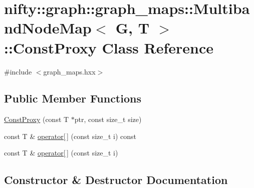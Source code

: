 \hypertarget{classnifty_1_1graph_1_1graph__maps_1_1MultibandNodeMap_1_1ConstProxy}{}\section{nifty\+:\+:graph\+:\+:graph\+\_\+maps\+:\+:Multiband\+Node\+Map$<$ G, T $>$\+:\+:Const\+Proxy Class Reference}
\label{classnifty_1_1graph_1_1graph__maps_1_1MultibandNodeMap_1_1ConstProxy}


{\ttfamily \#include $<$graph\+\_\+maps.\+hxx$>$}

\subsection*{Public Member Functions}
\begin{DoxyCompactItemize}
\item 
\hyperlink{classnifty_1_1graph_1_1graph__maps_1_1MultibandNodeMap_1_1ConstProxy_aeac8849b72e282139c7295338a01c03d}{Const\+Proxy} (const T $\ast$ptr, const size\+\_\+t size)
\item 
const T \& \hyperlink{classnifty_1_1graph_1_1graph__maps_1_1MultibandNodeMap_1_1ConstProxy_ac3afeffc19404871dc6b86a077717d84}{operator\mbox{[}$\,$\mbox{]}} (const size\+\_\+t i) const
\item 
const T \& \hyperlink{classnifty_1_1graph_1_1graph__maps_1_1MultibandNodeMap_1_1ConstProxy_ae5d15b412656d2505a13a6f6209adee9}{operator\mbox{[}$\,$\mbox{]}} (const size\+\_\+t i)
\end{DoxyCompactItemize}


\subsection{Constructor \& Destructor Documentation}
\mbox{\label{classnifty_1_1graph_1_1graph__maps_1_1MultibandNodeMap_1_1ConstProxy_aeac8849b72e282139c7295338a01c03d}} 
